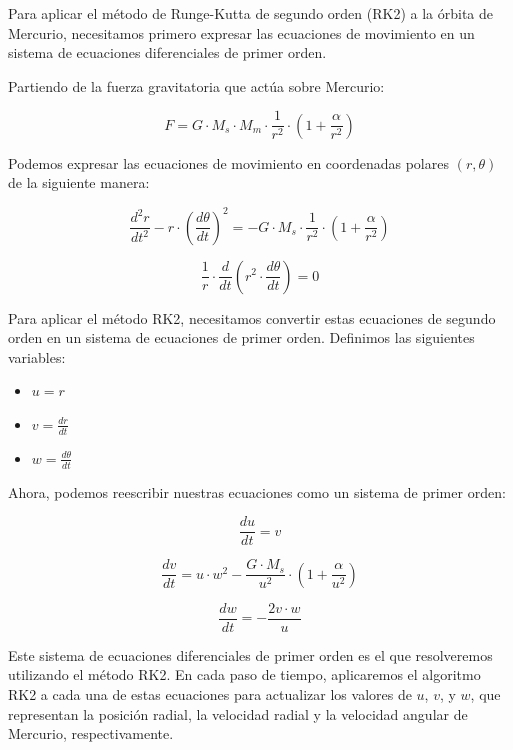 \documentclass[twocolumn]{article}
\begin{document}
Para aplicar el método de Runge-Kutta de segundo orden (RK2) a la órbita de Mercurio, necesitamos primero expresar las ecuaciones de movimiento en un sistema de ecuaciones diferenciales de primer orden.

Partiendo de la fuerza gravitatoria que actúa sobre Mercurio:

\begin{equation}
F = G \cdot M_s \cdot M_m \cdot \frac{1}{r^2} \cdot (1 + \frac{\alpha}{r^2})
\end{equation}

Podemos expresar las ecuaciones de movimiento en coordenadas polares $(r, \theta)$ de la siguiente manera:

\begin{equation}
\frac{d^2r}{dt^2} - r \cdot \left(\frac{d\theta}{dt}\right)^2 = -G \cdot M_s \cdot \frac{1}{r^2} \cdot (1 + \frac{\alpha}{r^2})
\end{equation}

\begin{equation}
\frac{1}{r} \cdot \frac{d}{dt}\left(r^2 \cdot \frac{d\theta}{dt}\right) = 0
\end{equation}

Para aplicar el método RK2, necesitamos convertir estas ecuaciones de segundo orden en un sistema de ecuaciones de primer orden. Definimos las siguientes variables:

\begin{itemize}
\item $u = r$
\item $v = \frac{dr}{dt}$
\item $w = \frac{d\theta}{dt}$
\end{itemize}

Ahora, podemos reescribir nuestras ecuaciones como un sistema de primer orden:

\begin{equation}
\frac{du}{dt} = v
\end{equation}

\begin{equation}
\frac{dv}{dt} = u \cdot w^2 - \frac{G \cdot M_s}{u^2} \cdot (1 + \frac{\alpha}{u^2})
\end{equation}

\begin{equation}
\frac{dw}{dt} = -\frac{2v \cdot w}{u}
\end{equation}

Este sistema de ecuaciones diferenciales de primer orden es el que resolveremos utilizando el método RK2. En cada paso de tiempo, aplicaremos el algoritmo RK2 a cada una de estas ecuaciones para actualizar los valores de $u$, $v$, y $w$, que representan la posición radial, la velocidad radial y la velocidad angular de Mercurio, respectivamente.
\end{document}
